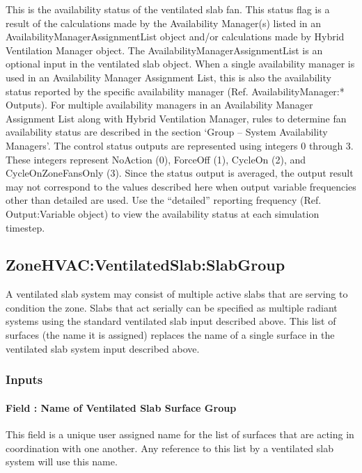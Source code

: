 This is the availability status of the ventilated slab fan. This status flag is a result of the calculations made by the Availability Manager(s) listed in an AvailabilityManagerAssignmentList object and/or calculations made by Hybrid Ventilation Manager object. The AvailabilityManagerAssignmentList is an optional input in the ventilated slab object. When a single availability manager is used in an Availability Manager Assignment List, this is also the availability status reported by the specific availability manager (Ref. AvailabilityManager:* Outputs). For multiple availability managers in an Availability Manager Assignment List along with Hybrid Ventilation Manager, rules to determine fan availability status are described in the section `Group -- System Availability Managers'. The control status outputs are represented using integers 0 through 3. These integers represent NoAction (0), ForceOff (1), CycleOn (2), and CycleOnZoneFansOnly (3). Since the status output is averaged, the output result may not correspond to the values described here when output variable frequencies other than detailed are used. Use the ``detailed'' reporting frequency (Ref. Output:Variable object) to view the availability status at each simulation timestep.

\subsection{ZoneHVAC:VentilatedSlab:SlabGroup}\label{zonehvacventilatedslabslabgroup}

A ventilated slab system may consist of multiple active slabs that are serving to condition the zone. Slabs that act serially can be specified as multiple radiant systems using the standard ventilated slab input described above. This list of surfaces (the name it is assigned) replaces the name of a single surface in the ventilated slab system input described above.

\subsubsection{Inputs}\label{inputs-11-013}

\paragraph{Field : Name of Ventilated Slab Surface Group}\label{field-name-of-ventilated-slab-surface-group}

This field is a unique user assigned name for the list of surfaces that are acting in coordination with one another. Any reference to this list by a ventilated slab system will use this name.

